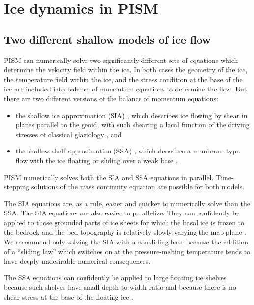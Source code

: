 \documentclass[11pt,final]{amsart}
\begin{document}
\clearpage
\newpage
\section{Ice dynamics in PISM}\label{sect:dynamics}

\subsection{Two different shallow models of ice flow}  PISM can numerically solve two significantly different sets of equations which determine the velocity field within the ice.  In both cases the geometry of the ice, the temperature field within the ice, and the stress condition at the base of the ice are included into balance of momentum equations to determine the flow.  But there are two different versions of the balance of momentum equations:\begin{itemize}
\item the shallow ice approximation (SIA) \cite{Hutter}, which describes ice flowing by shear in planes parallel to the geoid, with such shearing a local function of the driving stresses of classical glaciology \cite{Paterson}, and
\item the shallow shelf approximation (SSA) \cite{WeisGreveHutter}, which describes a membrane-type flow with the ice floating or sliding over a weak base \cite{Morland,MacAyeal,SchoofStream}.
\end{itemize}
PISM numerically solves both the SIA and SSA equations in parallel.  Time-stepping solutions of the mass continuity equation are possible for both models.

The SIA equations are, as a rule, easier and quicker to numerically solve than the SSA.  The SIA equations are also easier to parallelize.  They can confidently be applied to those grounded parts of ice sheets for which the basal ice is frozen to the bedrock and the bed topography is relatively slowly-varying the map-plane \cite{Fowler}.  We recommend only solving the SIA with a nonsliding base because the addition of a ``sliding law'' which switches on at the pressure-melting temperature tends to have deeply undesirable numerical consequences.

The SSA equations can confidently be applied to large floating ice shelves because such shelves have small depth-to-width ratio and because there is no shear stress at the base of the floating ice \cite{Morland,MorlandZainuddin}.
\end{document}
